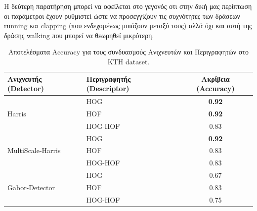 \documentclass[12pt]{article}
\begin{document}
Η δεύτερη παρατήρηση μπορεί να οφείλεται στο γεγονός οτι στην δική μας περίπτωση οι παράμετροι έχουν ρυθμιστεί ώστε να προσεγγίζουν τις συχνότητες των δράσεων running και clapping (που ενδεχομένως μοιάζουν μεταξύ τους) αλλά όχι και αυτή της δράσης walking που μπορεί να θεωρηθεί μικρότερη.

\begin{table}[H]
\centering
\begin{tabular}{@{}llc@{}}
\toprule
\textbf{Ανιχνευτής (Detector)} & \textbf{Περιγραφητής (Descriptor)} & \textbf{Ακρίβεια (Accuracy)} \\ \midrule
\multirow{3}{*}{Harris}          & HOG                                & \textbf{0.92}                \\
                                 & HOF                                & \textbf{0.92}                \\
                                 & HOG-HOF                            & 0.83                         \\ \midrule
\multirow{3}{*}{MultiScale-Harris} & HOG                              & \textbf{0.92}                \\
                                 & HOF                                & 0.83                         \\
                                 & HOG-HOF                            & 0.83                         \\ \midrule
\multirow{3}{*}{Gabor-Detector}  & HOG                                & 0.67                         \\
                                 & HOF                                & 0.83                         \\
                                 & HOG-HOF                            & 0.75                         \\ \bottomrule
\end{tabular}
\caption{Αποτελέσματα Accuracy για τους συνδυασμούς Ανιχνευτών και Περιγραφητών στο KTH dataset.}
\label{tab:results_kth}
\end{table}
\end{document}
